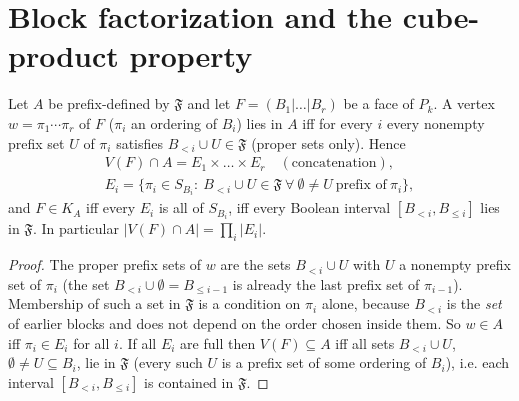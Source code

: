 \section{Block factorization and the cube-product property}
\begin{theorem}\label{thm:block}
Let $A$ be prefix-defined by $\mathfrak F$ and let $F=(B_1|\dots|B_r)$ be a face of $P_k$. A vertex $w=\pi_1\cdots\pi_r$ of $F$ ($\pi_i$ an ordering of $B_i$) lies in $A$ iff for every $i$ every nonempty prefix set $U$ of $\pi_i$ satisfies $B_{<i}\cup U\in\mathfrak F$ (proper sets only). Hence
\begin{gather*}
V(F)\cap A=E_1\times\dots\times E_r\quad(\text{concatenation}),\\ E_i=\{\pi_i\in S_{B_i}:\ B_{<i}\cup U\in\mathfrak F\ \forall\ \emptyset\ne U\ \text{prefix of}\ \pi_i\},\end{gather*}
and $F\in K_A$ iff every $E_i$ is all of $S_{B_i}$, iff every Boolean interval $[B_{<i},B_{\le i}]$ lies in $\mathfrak F$. In particular $|V(F)\cap A|=\prod_i|E_i|$.
\end{theorem}
\begin{proof}
The proper prefix sets of $w$ are the sets $B_{<i}\cup U$ with $U$ a nonempty prefix set of $\pi_i$ (the set $B_{<i}\cup\emptyset=B_{\le i-1}$ is already the last prefix set of $\pi_{i-1}$). Membership of such a set in $\mathfrak F$ is a condition on $\pi_i$ alone, because $B_{<i}$ is the \emph{set} of earlier blocks and does not depend on the order chosen inside them. So $w\in A$ iff $\pi_i\in E_i$ for all $i$. If all $E_i$ are full then $V(F)\subseteq A$ iff all sets $B_{<i}\cup U$, $\emptyset\neq U\subseteq B_i$, lie in $\mathfrak F$ (every such $U$ is a prefix set of some ordering of $B_i$), i.e. each interval $[B_{<i},B_{\le i}]$ is contained in $\mathfrak F$.
\end{proof}

